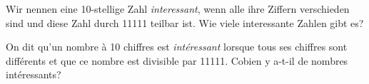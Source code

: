 Wir nennen eine 10-stellige Zahl \emph{interessant}, wenn alle ihre Ziffern verschieden sind und diese Zahl durch 11111 teilbar ist. Wie viele interessante Zahlen gibt es?

\bigskip

On dit qu'un nombre à 10 chiffres est \emph{intéressant} lorsque tous ses chiffres sont différents et que ce nombre est divisible par 11111. Cobien y a-t-il de nombres intéressants?